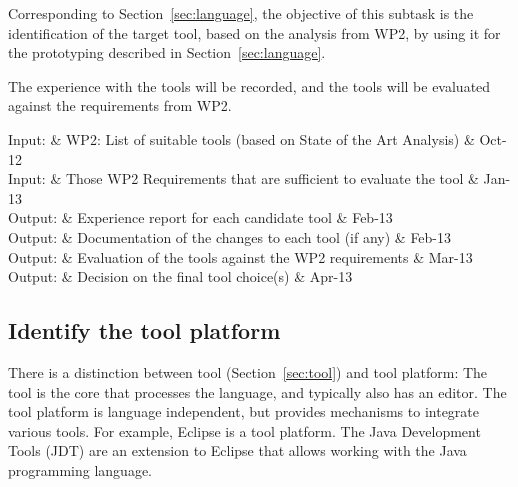 \documentclass{template/openetcs_article}
\begin{document}
Corresponding to Section~\ref{sec:language}, the objective of this subtask is the identification of the target tool, based on the analysis from WP2, by using it for the prototyping described in Section~\ref{sec:language}.

The experience with the tools will be recorded, and the tools will be evaluated against the requirements from WP2.

\begin{inoutput}
Input: & WP2: List of suitable tools (based on State of the Art Analysis) & Oct-12 \\
Input: & Those WP2 Requirements that are sufficient to evaluate the tool & Jan-13 \\
\hline
Output: & Experience report for each candidate tool & Feb-13 \\
Output: & Documentation of the changes to each tool (if any) & Feb-13 \\
Output: & Evaluation of the tools against the WP2 requirements & Mar-13 \\
Output: & Decision on the final tool choice(s) & Apr-13 \\
\end{inoutput}

\subsection{Identify the tool platform}
\label{sec:tool_platform}

There is a distinction between tool (Section~\ref{sec:tool}) and tool platform: The tool is the core that processes the language, and typically also has an editor.  The tool platform is language independent, but provides mechanisms to integrate various tools.  For example, Eclipse is a tool platform.  The Java Development Tools (JDT) are an extension to Eclipse that allows working with the Java programming language.
\end{document}
